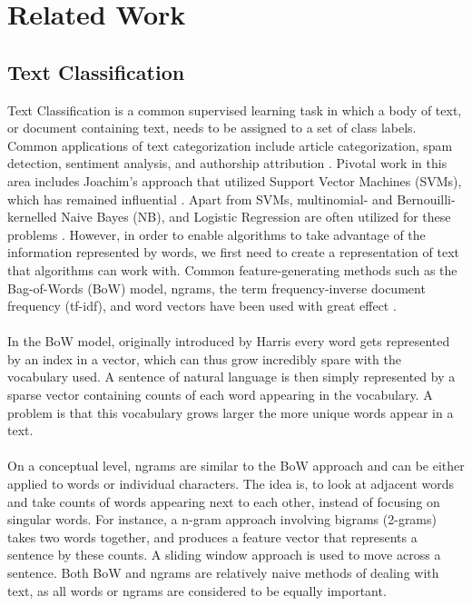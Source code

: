 \chapter{Related Work}\label{ch:rel}
\section{Text Classification}

Text Classification is a common supervised learning task in which a body of text, or document containing text, needs to be assigned to a set of class labels. Common applications of text categorization include article categorization, spam detection, sentiment analysis, and authorship attribution \cite{Sebastiani2002, Croft, Shrestha}. Pivotal work in this area includes Joachim’s approach that utilized Support Vector Machines (SVMs), which has remained influential \cite{Joachims1998}. Apart from SVMs, multinomial- and Bernouilli-kernelled Naive Bayes (NB), and Logistic Regression are often utilized for these problems \cite{Croft, Wang2012}. However, in order to enable algorithms to take advantage of the information represented by words, we first need to create a representation of text that algorithms can work with. Common feature-generating methods such as the Bag-of-Words (BoW) model, ngrams, the term frequency-inverse document frequency (tf-idf), and word vectors have been used with great effect \cite{Manning2008}.\\
\\
In the BoW model, originally introduced by Harris \cite{Harris1954} every word gets represented by an index in a vector, which can thus grow incredibly spare with the vocabulary used. A sentence of natural language is then simply represented by a sparse vector containing counts of each word appearing in the vocabulary. A problem is that this vocabulary grows larger the more unique words appear in a text.\\ 
\\
On a conceptual level, ngrams are similar to the BoW approach and can be either applied to words or individual characters. The idea is, to look at adjacent words and take counts of words appearing next to each other, instead of focusing on singular words. For instance, a n-gram approach involving bigrams (2-grams) takes two words together, and produces a feature vector that represents a sentence by these counts. A sliding window approach is used to move across a sentence. Both BoW and ngrams are relatively naive methods of dealing with text, as all words or ngrams are considered to be equally important. \\

